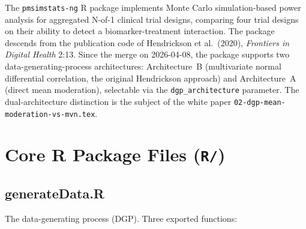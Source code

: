 \documentclass[11pt]{article}
\begin{document}
\maketitle
\thispagestyle{fancy}
\tableofcontents

The \texttt{pmsimstats-ng} R package implements Monte Carlo
simulation-based power analysis for aggregated N-of-1 clinical
trial designs, comparing four trial designs on their ability to
detect a biomarker-treatment interaction. The package descends
from the publication code of Hendrickson et al.\ (2020),
\textit{Frontiers in Digital Health} 2:13. Since the merge on
2026-04-08, the package supports two data-generating-process
architectures: Architecture~B (multivariate normal differential
correlation, the original Hendrickson approach) and
Architecture~A (direct mean moderation), selectable via the
\texttt{dgp\_architecture} parameter. The dual-architecture
distinction is the subject of the white paper
\texttt{02-dgp-mean-moderation-vs-mvn.tex}.

\section{Core R Package Files (\texttt{R/})}

\subsection{generateData.R}

The data-generating process (DGP). Three exported functions:
\end{document}
